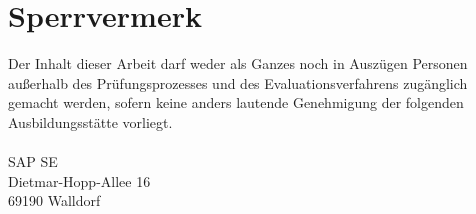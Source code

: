 \chapter*{Sperrvermerk}
Der Inhalt dieser Arbeit darf weder als Ganzes noch in Auszügen Personen außerhalb des Prüfungsprozesses und des Evaluationsverfahrens zugänglich gemacht werden, sofern keine anders lautende Genehmigung der folgenden Ausbildungsstätte vorliegt.\\\\
SAP SE\\
Dietmar-Hopp-Allee 16\\
69190 Walldorf  
\cleardoublepage
